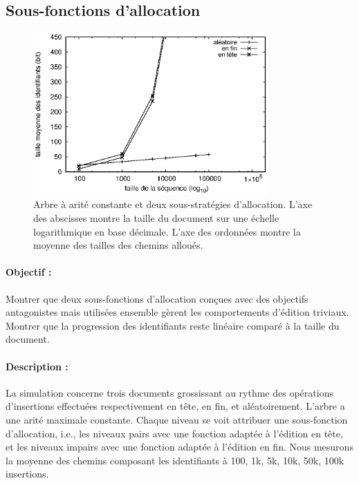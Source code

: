 \subsection{Sous-fonctions d'allocation}

\begin{figure}
  \centering
  \includegraphics[width=0.8\textwidth]{img/lseq/robin.eps}
  \caption{\label{repl:img:suballocation} Arbre à arité constante et deux
    sous-stratégies d'allocation. L'axe des abscisses montre la taille du
    document sur une échelle logarithmique en base décimale. L'axe des ordonnées
    montre la moyenne des tailles des chemins alloués.}
\end{figure}

\paragraph{Objectif :} Montrer que deux sous-fonctions d'allocation conçues avec
des objectifs antagonistes mais utilisées ensemble gèrent les comportements
d'édition triviaux. Montrer que la progression des identifiants reste linéaire
comparé à la taille du document.

\paragraph{Description :} La simulation concerne trois documents grossissant au
rythme des opérations d'insertions effectuées respectivement en tête, en fin, et
aléatoirement. L'arbre a une arité maximale constante. Chaque niveau se voit
attribuer une sous-fonction d'allocation, i.e., les niveaux pairs avec une
fonction adaptée à l'édition en tête, et les niveaux impairs avec une fonction
adaptée à l'édition en fin. Nous mesurons la moyenne des chemins composant les
identifiants à 100, 1k, 5k, 10k, 50k, 100k insertions.


